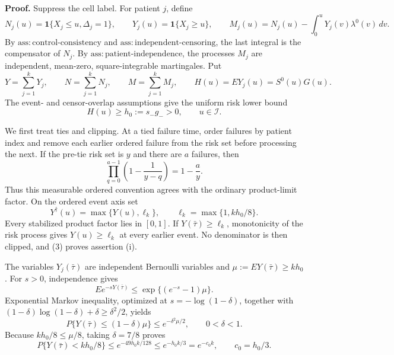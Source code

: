 \textbf{Proof.}
Suppress the cell label.  For patient \(j\), define
\[
 N_j(u)=\mathbf 1\{X_j\leq u,\Delta_j=1\},\qquad
 Y_j(u)=\mathbf 1\{X_j\geq u\},\qquad
 M_j(u)=N_j(u)-\int_0^uY_j(v)\lambda^0(v)\,dv.             \tag{1}
\]
By \(\mathrm{ass:control\mbox{-}consistency}\) and
\(\mathrm{ass:independent\mbox{-}censoring}\), the last integral is the
compensator of \(N_j\).  By
\(\mathrm{ass:patient\mbox{-}independence}\), the processes \(M_j\) are
independent, mean-zero, square-integrable martingales.  Put
\[
 Y=\sum_{j=1}^kY_j,\qquad N=\sum_{j=1}^kN_j,
 \qquad M=\sum_{j=1}^kM_j,
 \qquad H(u)=E Y_j(u)=S^0(u)G(u).
\]
The event- and censor-overlap assumptions give the uniform risk lower bound
\[
 H(u)\geq h_0:=s_-g_->0,
 \qquad u\in\mathcal I.                                  \tag{2}
\]

We first treat ties and clipping.  At a tied failure time, order failures by
patient index and remove each earlier ordered failure from the risk set before
processing the next.  If the pre-tie risk set is \(y\) and there are \(a\)
failures, then
\[
 \prod_{q=0}^{a-1}\left(1-\frac{1}{y-q}\right)=1-\frac{a}{y}. \tag{3}
\]
Thus this measurable ordered convention agrees with the ordinary
product-limit factor.  On the ordered event axis set
\[
 Y^\dagger(u)=\max\{Y(u),\ell_k\},
 \qquad \ell_k=\max\{1,kh_0/8\}.
\]
Every stabilized product factor lies in \([0,1]\).  If
\(Y(\bar\tau)\geq\ell_k\), monotonicity of the risk process gives
\(Y(u)\geq\ell_k\) at every earlier event.  No denominator is then clipped,
and (3) proves assertion (i).

The variables \(Y_j(\bar\tau)\) are independent Bernoulli variables and
\(\mu:=E Y(\bar\tau)\geq kh_0\).  For \(s>0\), independence gives
\[
 E e^{-sY(\bar\tau)}
 \leq \exp\{(e^{-s}-1)\mu\}.
\]
Exponential Markov inequality, optimized at
\(s=-\log(1-\delta)\), together with
\((1-\delta)\log(1-\delta)+\delta\geq\delta^2/2\), yields
\[
 P\{Y(\bar\tau)\leq(1-\delta)\mu\}
 \leq e^{-\delta^2\mu/2},
 \qquad 0<\delta<1.                                      \tag{4}
\]
Because \(kh_0/8\leq\mu/8\), taking \(\delta=7/8\) proves
\[
 P\{Y(\bar\tau)<kh_0/8\}
 \leq e^{-49h_0k/128}
 \leq e^{-h_0k/3}=e^{-c_0k},
 \qquad c_0=h_0/3.                                       \tag{5}
\]


